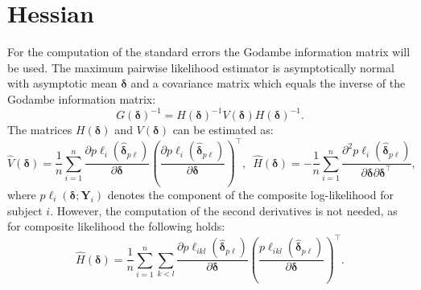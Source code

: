 \documentclass[a4paper,fleqn]{article}
\begin{document}
\section{Hessian}
For the computation of the standard errors the Godambe information matrix will be used. The maximum pairwise likelihood estimator is asymptotically normal with asymptotic mean $\bm \delta$ and a covariance matrix which equals the inverse of the Godambe information
matrix:
$$ G(\bm\delta)^{-1}=H(\bm\delta)^{-1}V(\bm\delta)H(\bm\delta)^{-1}.$$
The matrices $H(\bm\delta)$ and $V(\bm\delta)$ can be estimated as:
$$\hat V(\bm\delta)= \frac{1}{n} \sum_{i=1}^n \frac{\partial
        p\ell_i(\hat{\bm\delta}_{p\ell})}{\partial \bm\delta} \left(\frac{\partial
        p\ell_i(\hat{\bm\delta}_{p\ell})}{\partial \bm\delta}\right)^{\top},\enspace \hat H(\bm\delta) =
        -\frac{1}{n} \sum_{i=1}^n \frac{\partial^2
          p\ell_i(\hat{\bm\delta}_{p\ell})}{\partial
          \bm\delta\partial\bm\delta^\top},$$
where $p\ell_i(\bm\delta;\bm Y_i)$ denotes the component of the
composite log-likelihood for subject $i$.
However, the computation of the second derivatives is not needed, as for composite likelihood the following holds:
$$\hat H(\bm\delta) =
\frac{1}{n} \sum_{i=1}^n \sum_{k<l} \frac{\partial
        p\ell_{ikl}(\hat{\bm\delta}_{p\ell})}{\partial \bm\delta} \left(\frac{p\ell_{ikl}(\hat{\bm\delta}_{p\ell})}{\partial \bm\delta} \right)^\top.$$
\end{document}
